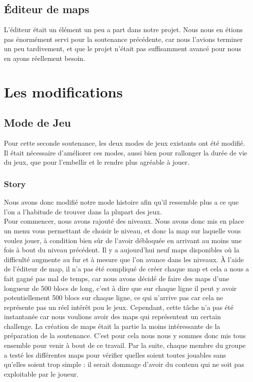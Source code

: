 \documentclass [11pt]{report}
\begin{document}
	\section{\'Editeur de maps}
		L'éditeur était un élément un peu a part dans notre projet. Nous nous en étions pas énormément servi pour la soutenance précédente, car nous l'avions terminer un peu tardivement, et que le projet n'était pas suffisamment avancé pour nous en ayons réellement besoin.
		
		
		\vspace{10mm}
		
		
\chapter{Les modifications}
	\section{Mode de Jeu}
		Pour cette seconde soutenance, les deux modes de jeux existants ont été modifié.
		Il était nécessaire d'améliorer ces modes, aussi bien pour rallonger la durée de vie du jeux, que pour l'embellir et le rendre plus agréable à jouer.
		\vspace{10mm}
		\subsection{Story}
			Nous avons donc modifié notre mode histoire afin qu'il ressemble plus a ce que l'on a l'habitude de trouver dans la plupart des jeux.\\
			
			\indent Pour commencer, nous avons rajout\'e des niveaux. Nous avons donc mis en place un menu vous permettant de choisir le niveau, et donc la map sur laquelle vous voulez jouer, à condition bien s\^ur de l'avoir débloquée en arrivant au moins une fois à bout du niveau précédent. Il y a aujourd'hui neuf maps disponibles o\`u la difficulté augmente au fur et à mesure que l'on avance dans les niveaux. \`A l'aide de l'éditeur de map, il n'a pas été compliqué de créer chaque map et cela a nous a fait gagné pas mal de temps, car nous avons décidé de faire des maps d'une longueur de 500 blocs de long, c'est \`a dire que sur chaque ligne il peut y avoir potentiellement 500 blocs sur chaque ligne, ce qui n'arrive pas car cela ne représente pas un réel intérêt pou le jeux. Cependant, cette t\^ache n'a pas \'et\'e instantanée car nous voulions avoir des maps qui représentent un certain challenge. La création de maps était la partie la moins intéressante de la préparation de la soutenance. C'est pour cela nous nous y sommes donc mis tous ensemble pour venir à bout de ce travail. Par la suite, chaque membre du groupe a testé les différentes maps pour vérifier quelles soient toutes jouables sans qu'elles soient trop simple : il serait dommage d'avoir du contenu qui ne soit pas exploitable par le joueur.\\
			
\end{document}
